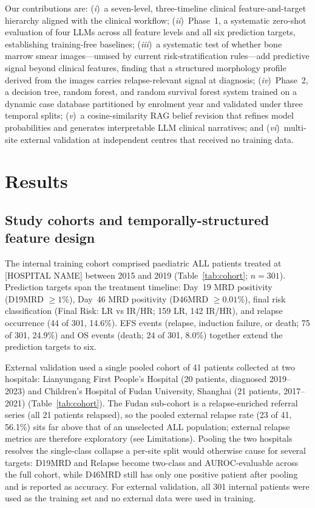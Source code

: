 \documentclass[pdflatex,sn-nature]{sn-jnl}
\begin{document}
Our contributions are: (\textit{i})~a seven-level, three-timeline
clinical feature-and-target hierarchy aligned with the clinical
workflow; (\textit{ii})~Phase~1, a systematic zero-shot evaluation of
four LLMs across all feature levels and all six prediction targets,
establishing training-free baselines; (\textit{iii})~a systematic
test of whether bone marrow smear images—unused by current
risk-stratification rules—add predictive signal beyond clinical
features, finding that a structured morphology profile derived from
the images carries relapse-relevant signal at diagnosis; (\textit{iv})~Phase~2, a decision
tree, random forest, and random survival forest system trained on a
dynamic case database partitioned by enrolment year and validated
under three temporal splits; (\textit{v})~a cosine-similarity RAG
belief revision that refines model probabilities and generates
interpretable LLM clinical narratives; and (\textit{vi})~multi-site
external validation at independent centres that received no training
data.

\section{Results}\label{sec:results}

\subsection{Study cohorts and temporally-structured feature design}
\label{sec:cohort}

The internal training cohort comprised paediatric ALL patients treated
at [HOSPITAL NAME] between 2015 and 2019 (Table~\ref{tab:cohort};
$n=301$).
Prediction targets span the treatment timeline: Day~19 MRD positivity
(D19MRD $\geq 1\%$), Day~46 MRD positivity (D46MRD $\geq 0.01\%$),
final risk classification (Final Risk: LR vs IR/HR; 159 LR, 142 IR/HR),
and relapse occurrence (44 of 301, 14.6\%).
EFS events (relapse, induction failure, or death; 75 of 301, 24.9\%)
and OS events (death; 24 of 301, 8.0\%) together extend the prediction
targets to six.

External validation used a single pooled cohort of 41 patients
collected at two hospitals: Lianyungang First People's Hospital
(20 patients, diagnosed 2019--2023) and Children's Hospital of Fudan
University, Shanghai (21 patients, 2017--2021) (Table~\ref{tab:cohort}).
The Fudan sub-cohort is a relapse-enriched referral series (all 21
patients relapsed), so the pooled external relapse rate (23 of 41,
56.1\%) sits far above that of an unselected ALL population; external
relapse metrics are therefore exploratory (see Limitations).
Pooling the two hospitals resolves the single-class collapse a
per-site split would otherwise cause for several targets: D19MRD and
Relapse become two-class and AUROC-evaluable across the full cohort,
while D46MRD still has only one positive patient after pooling and is
reported as accuracy.
For external validation, all 301 internal patients were used as the
training set and no external data were used in training.
\end{document}
